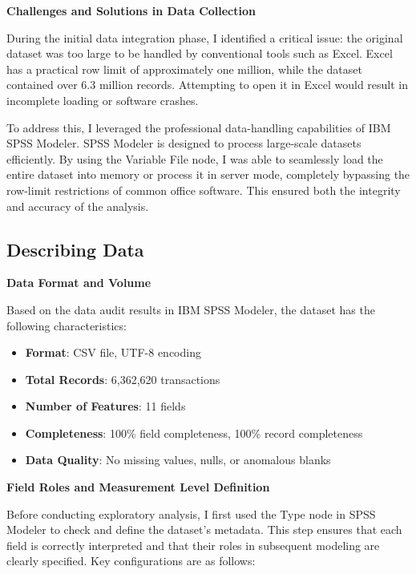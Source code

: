 \documentclass[sigplan,screen]{acmart}
\begin{document}
\vspace{0.3cm}

\textbf{Challenges and Solutions in Data Collection}

During the initial data integration phase, I identified a critical issue: the original dataset was too large to be handled by conventional tools such as Excel. Excel has a practical row limit of approximately one million, while the dataset contained over 6.3 million records. Attempting to open it in Excel would result in incomplete loading or software crashes.

To address this, I leveraged the professional data-handling capabilities of IBM SPSS Modeler. SPSS Modeler is designed to process large-scale datasets efficiently. By using the Variable File node, I was able to seamlessly load the entire dataset into memory or process it in server mode, completely bypassing the row-limit restrictions of common office software. This ensured both the integrity and accuracy of the analysis.

\subsection{Describing Data}

\textbf{Data Format and Volume}

Based on the data audit results in IBM SPSS Modeler, the dataset has the following characteristics:

\begin{itemize}
\item \textbf{Format}: CSV file, UTF-8 encoding
\item \textbf{Total Records}: 6,362,620 transactions
\item \textbf{Number of Features}: 11 fields
\item \textbf{Completeness}: 100\% field completeness, 100\% record completeness
\item \textbf{Data Quality}: No missing values, nulls, or anomalous blanks
\end{itemize}

\textbf{Field Roles and Measurement Level Definition}

Before conducting exploratory analysis, I first used the Type node in SPSS Modeler to check and define the dataset's metadata. This step ensures that each field is correctly interpreted and that their roles in subsequent modeling are clearly specified. Key configurations are as follows:
\end{document}
